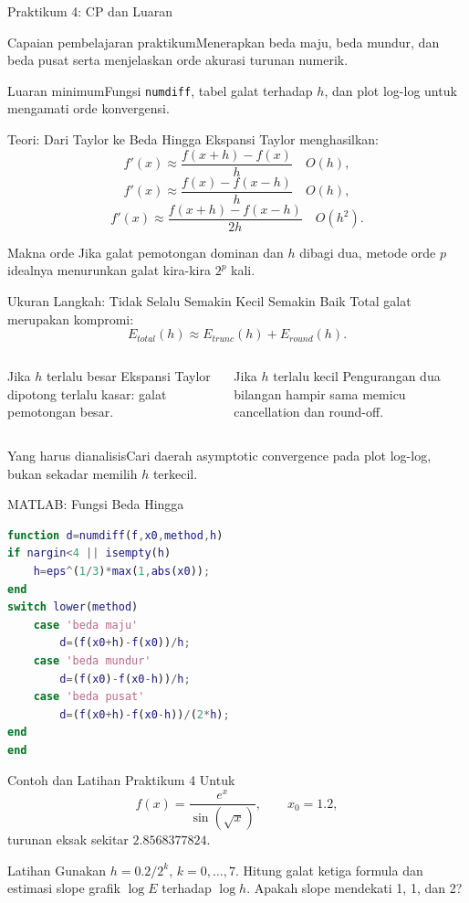 \documentclass[slides,english,noindex,lean,nobackpage,nocopyright,noupdate,nosummary]{enacom}
\newcommand{\CPBox}[1]{\begin{block}{Capaian pembelajaran praktikum}#1\end{block}}
\newcommand{\OutBox}[1]{\begin{exampleblock}{Luaran minimum}#1\end{exampleblock}}
\newcommand{\AnalysisBox}[1]{\begin{alertblock}{Yang harus dianalisis}#1\end{alertblock}}
\begin{document}
\begin{frame}{Praktikum 4: CP dan Luaran}
\CPBox{Menerapkan beda maju, beda mundur, dan beda pusat serta menjelaskan orde akurasi turunan numerik.}
\OutBox{Fungsi \texttt{numdiff}, tabel galat terhadap $h$, dan plot log-log untuk mengamati orde konvergensi.}
\end{frame}

\begin{frame}{Teori: Dari Taylor ke Beda Hingga}
Ekspansi Taylor menghasilkan:
\[
f'(x)\approx\frac{f(x+h)-f(x)}{h}\quad O(h),
\]
\[
f'(x)\approx\frac{f(x)-f(x-h)}{h}\quad O(h),
\]
\[
f'(x)\approx\frac{f(x+h)-f(x-h)}{2h}\quad O(h^2).
\]
\begin{block}{Makna orde}
Jika galat pemotongan dominan dan $h$ dibagi dua, metode orde $p$ idealnya menurunkan galat kira-kira $2^p$ kali.
\end{block}
\end{frame}

\begin{frame}{Ukuran Langkah: Tidak Selalu Semakin Kecil Semakin Baik}
Total galat merupakan kompromi:
\[
E_{total}(h)\approx E_{trunc}(h)+E_{round}(h).
\]
\begin{columns}[T]
\begin{block}{Jika $h$ terlalu besar}
Ekspansi Taylor dipotong terlalu kasar: galat pemotongan besar.
\end{block}
\begin{block}{Jika $h$ terlalu kecil}
Pengurangan dua bilangan hampir sama memicu cancellation dan round-off.
\end{block}
\end{columns}
\vfill
\AnalysisBox{Cari daerah asymptotic convergence pada plot log-log, bukan sekadar memilih $h$ terkecil.}
\end{frame}

\begin{frame}{MATLAB: Fungsi Beda Hingga}
\begin{lstlisting}[language=Matlab]
function d=numdiff(f,x0,method,h)
if nargin<4 || isempty(h)
    h=eps^(1/3)*max(1,abs(x0));
end
switch lower(method)
    case 'beda maju'
        d=(f(x0+h)-f(x0))/h;
    case 'beda mundur'
        d=(f(x0)-f(x0-h))/h;
    case 'beda pusat'
        d=(f(x0+h)-f(x0-h))/(2*h);
end
end
\end{lstlisting}
\end{frame}

\begin{frame}{Contoh dan Latihan Praktikum 4}
Untuk
\[
f(x)=\frac{e^x}{\sin(\sqrt{x})},\qquad x_0=1.2,
\]
turunan eksak sekitar $2.8568377824$.
\begin{exampleblock}{Latihan}
Gunakan $h=0.2/2^k$, $k=0,\ldots,7$. Hitung galat ketiga formula dan estimasi slope grafik $\log E$ terhadap $\log h$. Apakah slope mendekati 1, 1, dan 2?
\end{exampleblock}
\end{frame}
\end{document}
